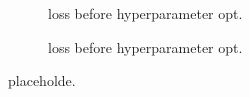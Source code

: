 \begin{figure}[H]
    \centering
    \begin{subfigure}{0.49\textwidth}
        \centering
        \caption{loss before hyperparameter opt.}
    \end{subfigure}
    \hfill
    \begin{subfigure}{0.49\textwidth}
        \centering
        \caption{loss before hyperparameter opt.}
    \end{subfigure}
    \caption{placeholde.}
    \label{fig:comp3}
\end{figure}
